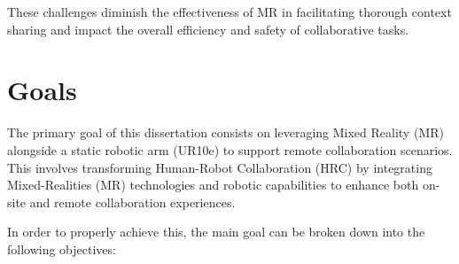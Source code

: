 These challenges diminish the effectiveness of \ac{MR} in facilitating thorough context sharing and impact the overall efficiency and safety of 
collaborative tasks.
\FloatBarrier

\section{Goals}
\label{section:Goals}
% 
The primary goal of this dissertation consists on leveraging Mixed Reality (\ac{MR}) alongside a static robotic arm (UR10e) to support remote collaboration scenarios. 
This involves transforming Human-Robot Collaboration (\ac{HRC}) by integrating Mixed-Realities (\ac{MR}) technologies and robotic capabilities to enhance both on-site and remote collaboration experiences.

In order to properly achieve this, the main goal can be broken down into the following objectives:

